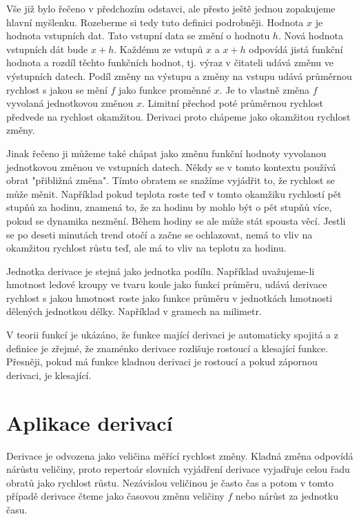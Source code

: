 \documentclass[12pt]{article}
\begin{document}
Vše již bylo řečeno v předchozím odstavci, ale přesto ještě jednou zopakujeme hlavní myšlenku. Rozeberme si tedy tuto definici podrobněji. Hodnota $x$ je hodnota vstupních dat. Tato vstupní data se změní o hodnotu $h$. Nová hodnota vstupních dát bude $x+h$. Každému ze  vstupů $x$ a $x+h$ odpovídá  jistá funkční hodnota a rozdíl těchto funkčních hodnot, tj. výraz v čitateli udává změnu ve výstupních  datech.  Podíl změny na výstupu a změny na vstupu udává průměrnou rychlost s jakou se mění $f$ jako funkce proměnné $x$.  Je to vlastně změna $f$ vyvolaná jednotkovou změnou $x$.  Limitní přechod poté průměrnou rychlost předvede na rychlost okamžitou. Derivaci proto chápeme jako okamžitou rychlost změny.

Jinak řečeno ji můžeme také chápat jako změnu funkční hodnoty vyvolanou jednotkovou změnou ve vstupních datech. Někdy se v tomto kontextu používá obrat "přibližná změna". Tímto obratem se snažíme vyjádřit to, že rychlost se může měnit. Například pokud teplota roste teď v tomto okamžiku rychlostí pět stupňů za hodinu, znamená to, že za hodinu by mohlo být o pět stupňů více, pokud se dynamika nezmění. Během hodiny se ale může stát spousta věcí. Jestli se po deseti minutách trend otočí a začne se ochlazovat, nemá to vliv na okamžitou rychlost růstu teď, ale má to vliv na teplotu za hodinu.

Jednotka derivace je stejná jako jednotka podílu. Například uvažujeme-li hmotnost ledové kroupy ve tvaru koule jako funkci průměru, udává derivace rychlost s jakou hmotnost roste jako funkce průměru v jednotkách hmotnosti dělených jednotkou délky. Například v gramech na milimetr.

V teorii funkcí je ukázáno, že funkce mající derivaci je automaticky spojitá a z definice je zřejmé, že znaménko derivace rozlišuje rostoucí a klesající funkce. Přesněji, pokud má funkce kladnou derivaci je rostoucí a pokud zápornou derivaci, je klesající.

\section*{Aplikace derivací}

Derivace je odvozena jako veličina měřící rychlost změny. Kladná změna odpovídá nárůstu veličiny, proto repertoár slovních vyjádření derivace vyjadřuje celou řadu obratů jako rychlost růstu. Nezávislou veličinou je často čas a potom v tomto případě derivace čteme jako časovou změnu veličiny $f$ nebo nárůst za jednotku času.
\end{document}
